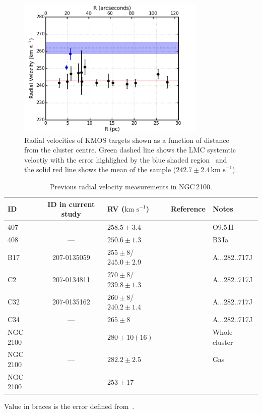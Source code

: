 \documentclass[useAMS,usenatbib]{mn2e}
\def\kms{$\mbox{km s}^{-1}$}
\begin{document}
\begin{figure}
 \includegraphics[width=9.0cm]{NGC2100-rv-v6}
 \caption{Radial velocities of KMOS targets shown as a function of distance from the cluster centre.
 Green dashed line shows the LMC systemtic veloctiy with the error highlighed by the blue shaded region~\citep[$262.2\pm3.4$\,\kms;][]{2012AJ....144....4M}
 and the solid red line shows the mean of the sample ($242.7\pm2.4\,$\kms).
\label{fig:rvs}
          }
\end{figure}

\begin{table}
\caption{
        Previous radial velocity measurements in NGC\,2100.\label{tb:rvs}
        }
\scriptsize
\begin{center}
\begin{tabular}{lclll}
 \hline
 \hline
ID & ID in current study & RV (\kms) & Reference & Notes \\
 \hline
407 & ---         & $258.5\pm3.4$           & \cite{2015arXiv150803490E} &  O9.5\,II  \\
408 & ---         & $250.6\pm1.3$           & \cite{2015arXiv150803490E} &  B3\,Ia    \\
B17 & 207-0135059 & $255\pm8$/$245.0\pm2.9$ & {\cite{1994A&A...282..717J}} \\
C2  & 207-0134811 & $270\pm8$/$239.8\pm1.3$ & {\cite{1994A&A...282..717J}} & \\
C32 & 207-0135162 & $260\pm8$/$240.2\pm1.4$ & {\cite{1994A&A...282..717J}} & \\
C34 & ---         & $265\pm8$               & {\cite{1994A&A...282..717J}} & \\
NGC\,2100 & ---   & $280\pm10(16)$          & {\cite{1972MNRAS.159..445A}} & Whole cluster\\
NGC\,2100 & --- & $282.2\pm2.5$             & {\cite{1971ApJ...169..271S}} & Gas\\
NGC\,2100 & --- & $253\pm17$                & {\cite{1970PhD...........F}} & \\

\hline
\end{tabular}
\end{center}
{Value in braces is the error defined from~\cite{1983ApJ...272..488F}.}
\end{table}
\end{document}

